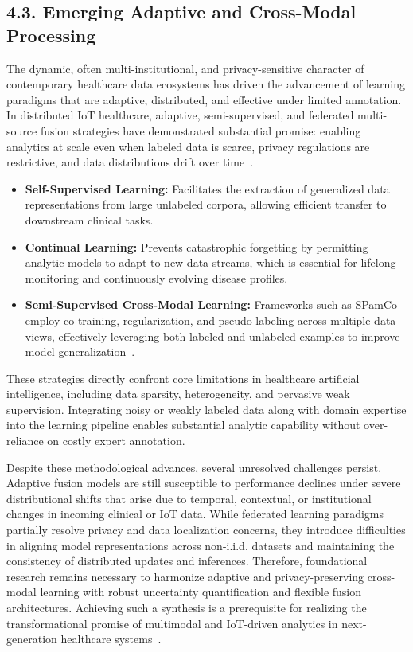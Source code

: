 \documentclass[11pt]{article}
\begin{document}
\subsection{4.3. Emerging Adaptive and Cross-Modal Processing}

The dynamic, often multi-institutional, and privacy-sensitive character of contemporary healthcare data ecosystems has driven the advancement of learning paradigms that are adaptive, distributed, and effective under limited annotation. In distributed IoT healthcare, adaptive, semi-supervised, and federated multi-source fusion strategies have demonstrated substantial promise: enabling analytics at scale even when labeled data is scarce, privacy regulations are restrictive, and data distributions drift over time~\cite{ref105, ref106, ref107}. 

\begin{itemize}
    \item \textbf{Self-Supervised Learning:} Facilitates the extraction of generalized data representations from large unlabeled corpora, allowing efficient transfer to downstream clinical tasks.
    \item \textbf{Continual Learning:} Prevents catastrophic forgetting by permitting analytic models to adapt to new data streams, which is essential for lifelong monitoring and continuously evolving disease profiles.
    \item \textbf{Semi-Supervised Cross-Modal Learning:} Frameworks such as SPamCo employ co-training, regularization, and pseudo-labeling across multiple data views, effectively leveraging both labeled and unlabeled examples to improve model generalization~\cite{ref104, ref105}.
\end{itemize}

These strategies directly confront core limitations in healthcare artificial intelligence, including data sparsity, heterogeneity, and pervasive weak supervision. Integrating noisy or weakly labeled data along with domain expertise into the learning pipeline enables substantial analytic capability without over-reliance on costly expert annotation.

Despite these methodological advances, several unresolved challenges persist. Adaptive fusion models are still susceptible to performance declines under severe distributional shifts that arise due to temporal, contextual, or institutional changes in incoming clinical or IoT data. While federated learning paradigms partially resolve privacy and data localization concerns, they introduce difficulties in aligning model representations across non-i.i.d. datasets and maintaining the consistency of distributed updates and inferences. Therefore, foundational research remains necessary to harmonize adaptive and privacy-preserving cross-modal learning with robust uncertainty quantification and flexible fusion architectures. Achieving such a synthesis is a prerequisite for realizing the transformational promise of multimodal and IoT-driven analytics in next-generation healthcare systems~\cite{ref104, ref105, ref106, ref107}.
\end{document}
